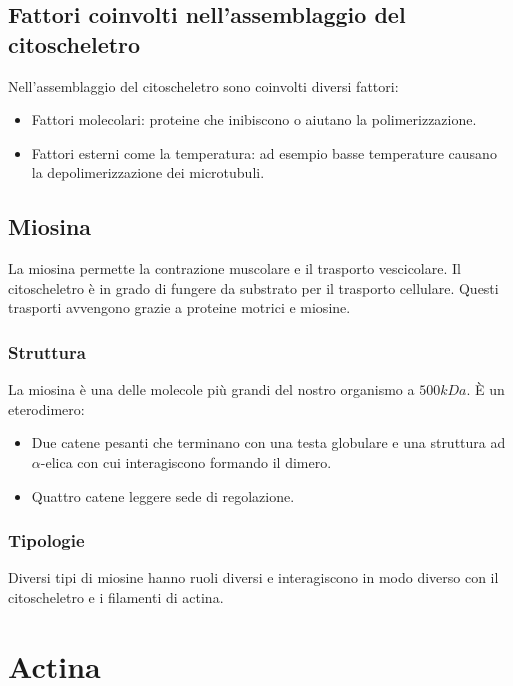 	\subsection{Fattori coinvolti nell'assemblaggio del citoscheletro}
	Nell'assemblaggio del citoscheletro sono coinvolti diversi fattori:
	\begin{multicols}{2}
		\begin{itemize}
			\item Fattori molecolari: proteine che inibiscono o aiutano la polimerizzazione.
			\item Fattori esterni come la temperatura: ad esempio basse temperature causano la depolimerizzazione dei microtubuli.
		\end{itemize}
	\end{multicols}

	\subsection{Miosina}
	La miosina permette la contrazione muscolare e il trasporto vescicolare.
	Il citoscheletro \`e in grado di fungere da substrato per il trasporto cellulare.
	Questi trasporti avvengono grazie a proteine motrici e miosine.
	
		\subsubsection{Struttura}
		La miosina \`e una delle molecole pi\`u grandi del nostro organismo a $500kDa$.
		\`E un eterodimero:
		\begin{multicols}{2}
			\begin{itemize}
				\item Due catene pesanti che terminano con una testa globulare e una struttura ad $\alpha$-elica con cui interagiscono formando il dimero.
				\item Quattro catene leggere sede di regolazione.
			\end{itemize}
		\end{multicols}

		\subsubsection{Tipologie}
		Diversi tipi di miosine hanno ruoli diversi e interagiscono in modo diverso con il citoscheletro e i filamenti di actina.

\section{Actina}

